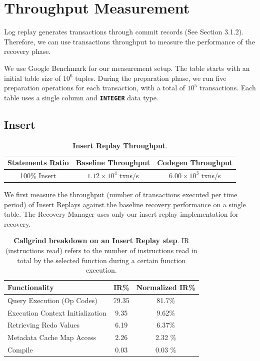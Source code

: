 \documentclass[12pt]{cmuthesis}
\newcommand{\dbSQL}[1]{\texttt{\textbf{#1}}\xspace}
\begin{document}
\section{Throughput Measurement}
Log replay generates transactions through commit records (See Section 3.1.2). Therefore, we can use transactions throughput to measure the performance of the recovery phase. 

We use Google Benchmark for our measurement setup. The table starts with an initial table size of $10^6$ tuples. During the preparation phase, we run five preparation operations for each transaction, with a total of $10^5$ transactions. Each table uses a single column and \dbSQL{INTEGER} data type.

\subsection{Insert}
\begin{table}[H]
\begin{center}
\begin{tabular}{ c c c } 
 \toprule
\textbf{Statements Ratio} & \textbf{Baseline Throughput} & \textbf{Codegen Throughput}\\ 
 \toprule
 100\% Insert & $1.12 \times 10^4$ txns/s & $6.00 \times 10^3$ txns/s\\
 \bottomrule
\end{tabular}
\caption{\textbf{Insert Replay Throughput}.}
\label{tab:throughput_exp_insert}
\end{center}
\end{table}
We first measure the throughput (number of transactions executed per time period) of Insert Replays against the baseline recovery performance on a single table. The Recovery Manager uses only our insert replay implementation for recovery.

\begin{table}[H]
\begin{center}
\begin{tabular}{ l c c } 
 \toprule
\textbf{Functionality} & \textbf{IR\%} & \textbf{Normalized IR\%} \\ 
 \toprule
Query Execution (Op Codes) & 79.35 & 81.7\% \\
 \midrule
 Execution Context Initialization & 9.35 & 9.62\%  \\ 
 \midrule
 Retrieving Redo Values & 6.19 & 6.37\%  \\
 \midrule
 Metadata Cache Map Access & 2.26 & 2.32 \%  \\
 \midrule
 Compile & 0.03 & 0.03 \% \\
 \bottomrule
\end{tabular}

\caption{\textbf{Callgrind breakdown on an Insert Replay step}. IR (instructions read) refers to the number of instructions read in total by the selected function during a certain function execution.}
\label{tab:throughput_exp_insert_overhead_all}
\end{center}
\end{table}
\end{document}
